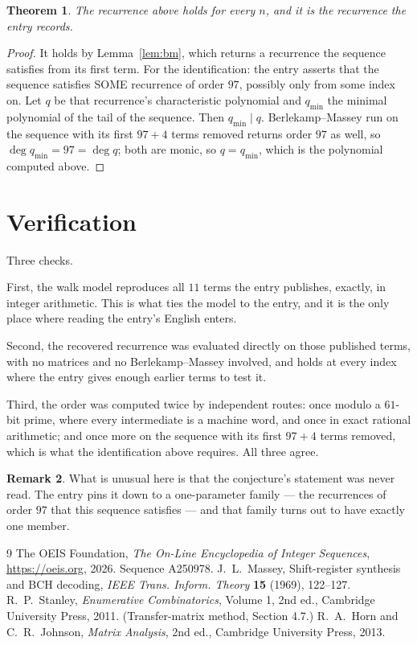 \documentclass[11pt,a4paper]{article}
\theoremstyle{plain}
\newtheorem{theorem}{Theorem}
\theoremstyle{definition}
\newtheorem{remark}[theorem]{Remark}
\begin{document}
\begin{theorem}
The recurrence above holds for every $n$, and it is the recurrence the entry records.
\end{theorem}

\begin{proof}
It holds by Lemma~\ref{lem:bm}, which returns a recurrence the sequence satisfies from its
first term. For the identification: the entry asserts that the sequence satisfies SOME
recurrence of order $97$, possibly only from some index on. Let $q$ be that recurrence's
characteristic polynomial and $q_{\min}$ the minimal polynomial of the tail of the sequence.
Then $q_{\min}\mid q$. Berlekamp--Massey run on the sequence with its first $97+4$ terms
removed returns order $97$ as well, so $\deg q_{\min}=97=\deg q$; both are monic, so
$q=q_{\min}$, which is the polynomial computed above.
\end{proof}

\section{Verification}

Three checks.

First, the walk model reproduces all $11$ terms the entry publishes, exactly, in integer
arithmetic. This is what ties the model to the entry, and it is the only place where reading
the entry's English enters.

Second, the recovered recurrence was evaluated directly on those published terms, with no
matrices and no Berlekamp--Massey involved, and holds at every index where the entry gives
enough earlier terms to test it.

Third, the order was computed twice by independent routes: once modulo a $61$-bit prime, where
every intermediate is a machine word, and once in exact rational arithmetic; and once more on
the sequence with its first $97+4$ terms removed, which is what the identification above
requires. All three agree.

\begin{remark}
What is unusual here is that the conjecture's statement was never read. The entry pins it down
to a one-parameter family --- the recurrences of order $97$ that this sequence satisfies
--- and that family turns out to have exactly one member.
\end{remark}

\begin{thebibliography}{9}
 The OEIS Foundation, \emph{The On-Line Encyclopedia of Integer
Sequences}, \url{https://oeis.org}, 2026. Sequence A250978.
 J.~L.~Massey, Shift-register synthesis and BCH decoding, \emph{IEEE
Trans. Inform. Theory} \textbf{15} (1969), 122--127.
 R.~P.~Stanley, \emph{Enumerative Combinatorics}, Volume 1, 2nd ed.,
Cambridge University Press, 2011. (Transfer-matrix method, Section 4.7.)
 R.~A.~Horn and C.~R.~Johnson, \emph{Matrix Analysis}, 2nd ed., Cambridge
University Press, 2013.
\end{thebibliography}
\end{document}
